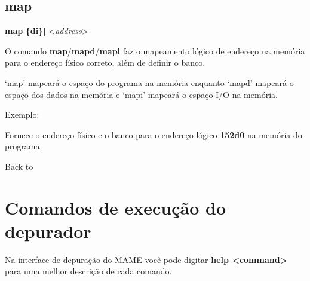 \documentclass[letterpaper,10pt,brazil]{sphinxmanual}
\begin{document}
\subsection{map}
\label{debugger/memory:map}\label{debugger/memory:debugger-command-map}
\begin{DUlineblock}{0em}
\item[]
\begin{DUlineblock}{\DUlineblockindent}
\item[] \textbf{map{[}\{d\textbar{}i\}{]}} \textless{}\emph{address}\textgreater{}
\item[] 
\end{DUlineblock}
\item[] O comando \textbf{map}/\textbf{mapd}/\textbf{mapi} faz o mapeamento lógico de endereço na memória para o endereço físico correto, além de definir o banco.
\item[] `map' mapeará o espaço do programa na memória enquanto `mapd' mapeará o espaço dos dados na memória e `mapi' mapeará o espaço I/O na memória.
\item[] 
\item[] Exemplo:
\item[] 
\item[]
\begin{DUlineblock}{\DUlineblockindent}
\item[] 
\item[] 
\end{DUlineblock}
\item[] Fornece o endereço físico e o banco para o endereço lógico \textbf{152d0} na memória do programa
\item[] 
\item[] Back to {\hyperref[debugger/memory:debugger\string-memory\string-list]{}}
\end{DUlineblock}


\section{Comandos de execução do depurador}
\label{debugger/execution:comandos-de-execucao-do-depurador}\label{debugger/execution::doc}\label{debugger/execution:debugger-execution-list}
Na interface de depuração do MAME você pode digitar \textbf{help \textless{}command\textgreater{}}
para uma melhor descrição de cada comando.
\end{document}
